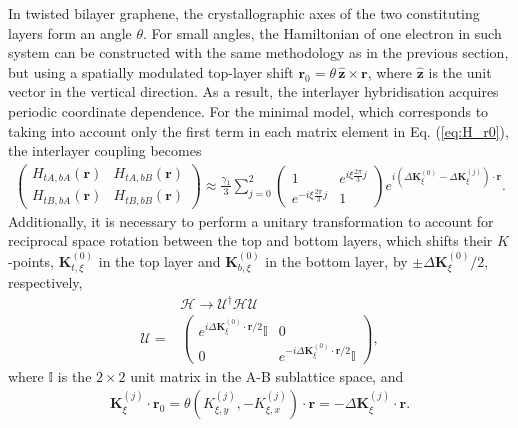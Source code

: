 \documentclass[showpacs,aps,prb,reprint,twocolumn]{revtex4-1}
\begin{document}
In twisted bilayer graphene, the crystallographic axes of the two constituting layers form an angle $\theta$. For small angles, the Hamiltonian of one electron in such system can be constructed with the same methodology as in the previous section, but using a spatially modulated top-layer shift $\boldsymbol{r}_0=\theta\,\hat{\boldsymbol{z}}\times\boldsymbol{r}$, where $\hat{\boldsymbol{z}}$ is the unit vector in the vertical direction. As a result, the interlayer hybridisation acquires periodic coordinate dependence. For the minimal model, which corresponds to taking into account only the first term in each matrix element in Eq. (\ref{eq:H_r0}), the interlayer coupling becomes
\begin{align}
\left(
\begin{matrix}
H_{tA,bA}(\boldsymbol{r})&
H_{tA,bB}(\boldsymbol{r})\\
H_{tB,bA}(\boldsymbol{r})&
H_{tB,bB}(\boldsymbol{r})
\end{matrix}
\right)
\approx\!\frac{\gamma_1}{3}
\!\sum_{j=0}^2
\left(
\begin{matrix}
1&e^{i\xi\frac{2\pi}{3}j}\\
e^{-i\xi\frac{2\pi}{3}j}&1
\end{matrix}
\right)e^{i(\Delta\boldsymbol{K}_\xi^{(0)}-\Delta\boldsymbol{K}_\xi^{(j)})\cdot\boldsymbol{r}}.
\end{align}
Additionally, it is necessary to perform a unitary transformation to account for reciprocal space rotation between the top and bottom layers, which shifts their $K$-points, $\boldsymbol{K}_{t,\xi}^{(0)}$ in the top layer and $\boldsymbol{K}_{b,\xi}^{(0)}$ in the bottom layer, by $\pm\Delta\boldsymbol{K}_\xi^{(0)}/2$, respectively,
\begin{align}\label{eq:U}
&\mathcal{H}\to\mathcal{U}^\dagger\mathcal{H}\mathcal{U}\\
\mathcal{U}=&
\left(
\begin{matrix}
e^{i\Delta\boldsymbol{K}_\xi^{(0)}\cdot\boldsymbol{r}/2}
\mathbb{I}&0\\
0&
e^{-i\Delta\boldsymbol{K}_\xi^{(0)}\cdot\boldsymbol{r}/2}\mathbb{I}
\end{matrix}
\right),\nonumber
\end{align}
where $\mathbb{I}$ is the $2\times2$ unit matrix in the A-B sublattice space, and
\begin{align}\label{eq:DeltaK}
\boldsymbol{K}_\xi^{(j)}\cdot\boldsymbol{r}_0=
\theta\left(K_{\xi,y}^{(j)},-K_{\xi,x}^{(j)}\right)\cdot\boldsymbol{r}=
-\Delta\boldsymbol{K}_\xi^{(j)}\cdot\boldsymbol{r}.\nonumber
\end{align}
\end{document}
